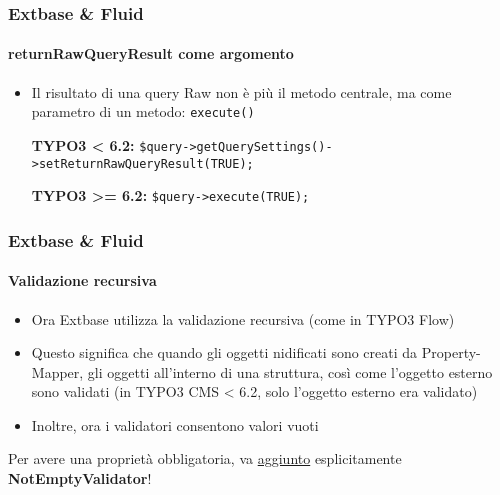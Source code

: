 
\begin{frame}[fragile]
	\frametitle{Extbase \& Fluid}
	\framesubtitle{returnRawQueryResult come argomento}

	\lstset{
		basicstyle=\smaller\ttfamily
	}

	\begin{itemize}
		\item Il risultato di una query Raw non è più il metodo centrale,\newline
			ma come parametro di un metodo: \texttt{execute()}
			\newline

			\smaller\textbf{TYPO3 < 6.2:}\normalsize\newline
			\lstinline!$query->getQuerySettings()->setReturnRawQueryResult(TRUE);!
			\newline

			\smaller\textbf{TYPO3 >= 6.2:}\normalsize\newline
			\lstinline!$query->execute(TRUE);!

	\end{itemize}

\end{frame}


\begin{frame}[fragile]
	\frametitle{Extbase \& Fluid}
	\framesubtitle{Validazione recursiva}

	\begin{itemize}
		\item Ora Extbase utilizza la validazione recursiva (come in TYPO3 Flow)
		\item Questo significa che quando gli oggetti nidificati sono creati da Property-Mapper,
			gli oggetti all'interno di una struttura, così come l'oggetto esterno sono validati\newline
			(in TYPO3 CMS < 6.2, solo l'oggetto esterno era validato)
		\item Inoltre, ora i validatori consentono valori vuoti
	\end{itemize}

	\breakingchange

	\smaller\begin{center} Per avere una proprietà obbligatoria, va \underline{aggiunto} esplicitamente \textbf{NotEmptyValidator}!\end{center}\normalsize

\end{frame}

